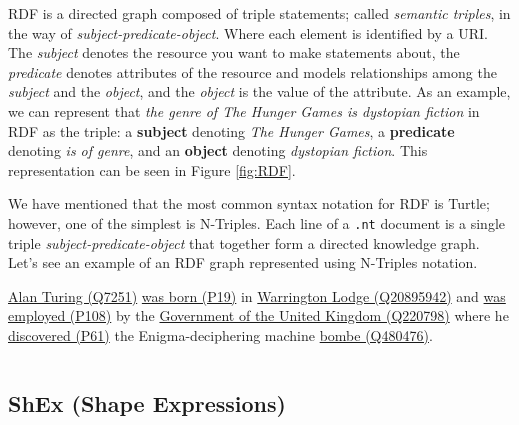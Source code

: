 RDF is a directed graph composed of triple statements; called \textit{semantic triples}, in the way of \textit{subject-predicate-object}. Where each element is identified by a URI. The \textit{subject} denotes the resource you want to make statements about, the \textit{predicate} denotes attributes of the resource and models relationships among the \textit{subject} and the \textit{object}, and the \textit{object} is the value of the attribute. As an example, we can represent that \textit{the genre of The Hunger Games is dystopian fiction} in RDF as the triple: a \textbf{subject} denoting \textit{The Hunger Games}, a \textbf{predicate} denoting \textit{is of genre}, and an \textbf{object} denoting \textit{dystopian fiction}. This representation can be seen in Figure \ref{fig:RDF}.

We have mentioned that the most common syntax notation for RDF is Turtle; however, one of the simplest is N-Triples. Each line of a \texttt{.nt} document is a single triple \textit{subject-predicate-object} that together form a directed knowledge graph. Let's see an example of an RDF graph represented using N-Triples notation.

\begin{example}
    \href{https://www.wikidata.org/entity/Q7251}{Alan Turing (Q7251)} \href{https://www.wikidata.org/entity/P19}{was born (P19)} in \href{https://www.wikidata.org/entity/Q20895942}{Warrington Lodge (Q20895942)} and \href{https://www.wikidataWShEx.org/entity/P108}{was employed (P108)} by the \href{https://www.wikidata.org/entity/Q220798}{Government of the United Kingdom (Q220798)} where he \href{https://www.wikidata.org/entity/P61}{discovered (P61)} the Enigma-deciphering machine \href{https://www.wikidata.org/entity/Q480476}{bombe (Q480476)}.
\end{example}

\inputminted{turtle}{listings/serialization.nt}

\subsection{ShEx (Shape Expressions)}

